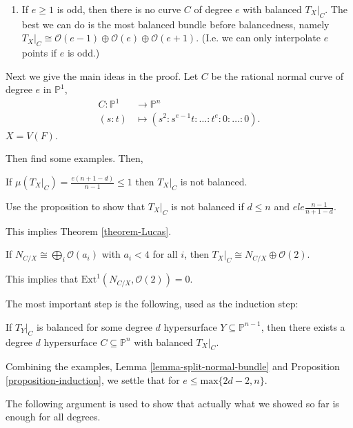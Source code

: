 {\begin{theorem}
\begin{theorem}
\begin{enumerate}
\item If $e \geq 1$ is odd,
then there is no curve $C$ of degree $e$ 
with balanced $T_X|_C$.
The best we can do is the most balanced bundle
before balancedness, namely
$T_X|_C \cong \mathcal{O}(e-1)\oplus\mathcal{O}(e)\oplus\mathcal{O}(e+1)$. 
(I.e. we can only interpolate $e$ points if $e$ is odd.)
\end{enumerate}

Next we give the main ideas in the proof.
Let $C$ be the rational normal curve
of degree $e$ in $\mathbb{P}^1$,
\begin{align*}
C:\mathbb{P}^1  &\longrightarrow \mathbb{P}^n \\
(s:t) &\longmapsto (s^2:s^{e-1}t:\ldots:t^e:0:\ldots:0).
\end{align*}
$X=V(F)$.

Then find some examples. Then,

\begin{proposition}
\label{proposition-proposition}
If $\mu(T_X|_{C})=\frac{e(n+1-d)}{n-1}\leq 1$
then $T_X|_{C}$ is not balanced.
\end{proposition}

\noindent
Use the proposition to show that $T_X|_C$
is not balanced if $d \leq  n$ 
and $e le \frac{ n-1}{n+1-d}$.

This implies Theorem \ref{theorem-Lucas}.

\begin{lemma}
\label{lemma-split-normal-bundle}
If $N_{C/X}\cong \bigoplus_i \mathcal{O}(a_i)$ 
with $a_i < 4$ for all $i$,
then $T_{X}|_C \cong N_{C/X} \oplus \mathcal{O}(2)$.
\end{lemma}

\noindent
This implies that $\text{Ext}^1(N_{C/X},\mathcal{O}(2))=0$.

The most important step is the following,
used as the induction step:

\begin{proposition}
\label{proposition-induction}
If $T_Y|_C$ is balanced for some degree $d$ 
hypersurface $Y \subseteq \mathbb{P}^{n-1}$,
then there exists a degree $d$ hypersurface
$C \subseteq \mathbb{P}^n$ with balanced
$T_X|_C$.
\end{proposition}

\noindent
Combining the examples, Lemma \ref{lemma-split-normal-bundle}
and Proposition \ref{proposition-induction},
we settle that for $e \leq  \text{max}\{2d-2,n\}$.

The following argument is used to show that 
actually what we showed so far is enough for all degrees.


\end{theorem}
\end{theorem}}
